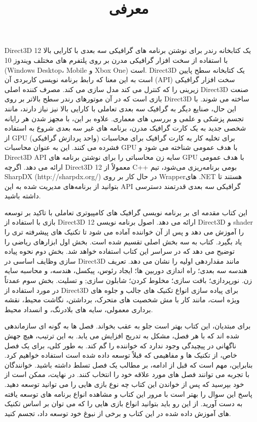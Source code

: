 \documentclass[oneside]{book}
\begin{document}
    \pagestyle{headings}
    \maketitle

    

    \title{
        \center \Huge
        معرفی \\[25pt]
    }

    {Direct3D 12 یک کتابخانه رندر برای نوشتن برنامه های گرافیکی سه بعدی با کارایی بالا با استفاده از سخت افزار گرافیکی مدرن بر روی پلتفرم های مختلف ویندوز 10 (Windows Desktop، Mobile و Xbox One) است. Direct3D یک کتابخانه سطح پایین است به این معنا که رابط برنامه نویسی کاربردی آن (API) سخت افزار گرافیکی زیرینی را که کنترل می کند مدل سازی می کند. مصرف کننده اصلی Direct3D صنعت بازی است که در آن موتورهای رندر سطح بالاتر بر روی Direct3D ساخته می شوند. با این حال، صنایع دیگر به گرافیک سه بعدی تعاملی با کارایی بالا نیز نیاز دارند، مانند تجسم پزشکی و علمی و بررسی های معماری. علاوه بر این، با مجهز شدن هر رایانه شخصی جدید به یک کارت گرافیک مدرن، برنامه های غیر سه بعدی شروع به استفاده از GPU (واحد پردازش گرافیکی) برای تخلیه کار به کارت گرافیک برای محاسبات فشرده می کنند. این به عنوان محاسبات GPU با هدف عمومی شناخته می شود و Direct3D API سایه زن محاسباتی را برای نوشتن برنامه های GPU با هدف عمومی ارائه می دهد. اگرچه Direct3D 12 معمولاً از C++ بومی برنامه‌ریزی می‌شود، تیم SharpDX (http://sharpdx.org/) در حال کار بر روی Wrapper‌های .NET هستند تا بتوانید از برنامه‌های مدیریت شده به این API گرافیکی سه بعدی قدرتمند دسترسی داشته باشید.}

    {این کتاب مقدمه ای بر برنامه نویسی گرافیک های کامپیوتری تعاملی با تاکید بر توسعه بازی با استفاده از Direct3D 12 ارائه می دهد. اصول برنامه نویسی Direct3D و shader را آموزش می دهد و پس از آن خواننده آماده می شود تا تکنیک های پیشرفته تری را یاد بگیرد. کتاب به سه بخش اصلی تقسیم شده است. بخش اول ابزارهای ریاضی را توضیح می دهد که در سراسر این کتاب استفاده خواهد شد. بخش دوم نحوه پیاده سازی وظایف اساسی در Direct3D مانند مقداردهی اولیه را نشان می دهد. تعریف هندسه سه بعدی؛ راه اندازی دوربین ها؛ ایجاد رئوس، پیکسل، هندسه، و محاسبه سایه زن. نورپردازی؛ بافت سازی؛ مخلوط کردن؛ شابلون سازی; و تسلیت. بخش سوم عمدتاً در مورد استفاده از Direct3D برای پیاده سازی انواع تکنیک های جالب و جلوه های ویژه است، مانند کار با مش شخصیت های متحرک، برداشتن، نگاشت محیط، نقشه برداری معمولی، سایه های بلادرنگ، و انسداد محیط.}

    {برای مبتدیان، این کتاب بهتر است جلو به عقب بخواند. فصل ها به گونه ای سازماندهی شده اند که با هر فصل، مشکل به تدریج افزایش می یابد. به این ترتیب، هیچ جهش ناگهانی در پیچیدگی وجود ندارد که خواننده را گم کند. به طور کلی، برای یک فصل خاص، از تکنیک ها و مفاهیمی که قبلاً توسعه داده شده است استفاده خواهیم کرد. بنابراین، مهم است که قبل از ادامه، بر مطالب یک فصل تسلط داشته باشید. خوانندگان با تجربه می توانند فصل های مورد علاقه خود را انتخاب کنند. در نهایت، ممکن است از خود بپرسید که پس از خواندن این کتاب چه نوع بازی هایی را می توانید توسعه دهید. پاسخ این سوال را بهتر است با مرور این کتاب و مشاهده انواع برنامه های توسعه یافته به دست آورید. از این رو باید بتوانید انواع بازی هایی را که می توان بر اساس تکنیک های آموزش داده شده در این کتاب و برخی از نبوغ خود توسعه داد، تجسم کنید.}
\end{document}
